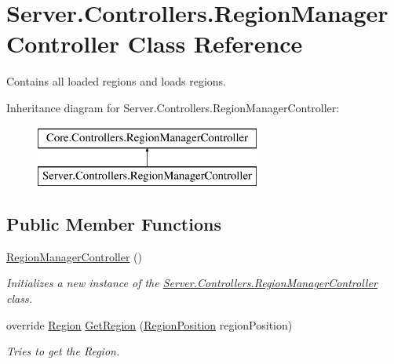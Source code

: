 \hypertarget{classServer_1_1Controllers_1_1RegionManagerController}{}\section{Server.\+Controllers.\+Region\+Manager\+Controller Class Reference}
\label{classServer_1_1Controllers_1_1RegionManagerController}


Contains all loaded regions and loads regions.  


Inheritance diagram for Server.\+Controllers.\+Region\+Manager\+Controller\+:\begin{figure}[H]
\begin{center}
\leavevmode
\includegraphics[height=2.000000cm]{classServer_1_1Controllers_1_1RegionManagerController}
\end{center}
\end{figure}
\subsection*{Public Member Functions}
\begin{DoxyCompactItemize}
\item 
\hyperlink{classServer_1_1Controllers_1_1RegionManagerController_aa2b8b1d0c7c0d134a7d98a63c5c42784}{Region\+Manager\+Controller} ()
\begin{DoxyCompactList}\small\item\em Initializes a new instance of the \hyperlink{classServer_1_1Controllers_1_1RegionManagerController}{Server.\+Controllers.\+Region\+Manager\+Controller} class. \end{DoxyCompactList}\item 
override \hyperlink{classCore_1_1Models_1_1Region}{Region} \hyperlink{classServer_1_1Controllers_1_1RegionManagerController_a14319718114aedea38984b1bf61395a4}{Get\+Region} (\hyperlink{classCore_1_1Models_1_1RegionPosition}{Region\+Position} region\+Position)
\begin{DoxyCompactList}\small\item\em Tries to get the Region. \end{DoxyCompactList}\end{DoxyCompactItemize}
